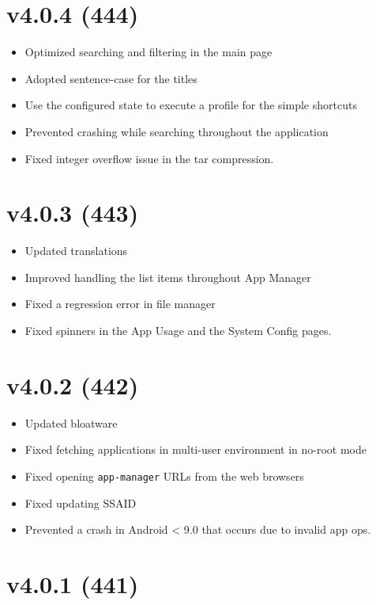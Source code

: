 \section{v4.0.4 (444)}\label{sec:v4.0.4-(444)}
\begin{itemize}
    \item Optimized searching and filtering in the main page
    \item Adopted sentence-case for the titles
    \item Use the configured state to execute a profile for the simple shortcuts
    \item Prevented crashing while searching throughout the application
    \item Fixed integer overflow issue in the tar compression.
\end{itemize}

\section{v4.0.3 (443)}\label{sec:v4.0.3-(443)}
\begin{itemize}
    \item Updated translations
    \item Improved handling the list items throughout App Manager
    \item Fixed a regression error in file manager
    \item Fixed spinners in the App Usage and the System Config pages.
\end{itemize}

\section{v4.0.2 (442)}\label{sec:v4.0.2-(442)}
\begin{itemize}
    \item Updated bloatware
    \item Fixed fetching applications in multi-user environment in no-root mode
    \item Fixed opening \texttt{app-manager} URLs from the web browsers
    \item Fixed updating SSAID
    \item Prevented a crash in Android < 9.0 that occurs due to invalid app ops.
\end{itemize}

\section{v4.0.1 (441)}\label{sec:v4.0.1-(441)}
